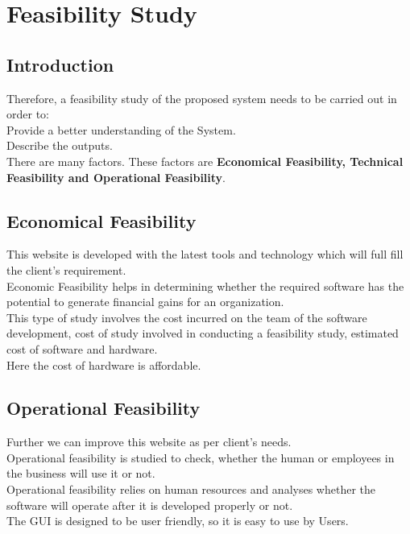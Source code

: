 \chapter{Feasibility Study}


\section{Introduction}
Therefore, a feasibility study of the proposed system needs to be carried out in order to:\\
\textbullet \hspace{0.2cm} 	Provide a better understanding of the System.\\
\textbullet \hspace{0.2cm}	Describe the outputs.\\

There are many factors. These factors are \textbf{Economical Feasibility, Technical Feasibility and Operational Feasibility}.\\



\section{Economical Feasibility}
\textbullet \hspace{0.2cm} This website is developed with the latest tools and technology which will full fill the client’s requirement.\\
\textbullet \hspace{0.2cm} Economic Feasibility helps in determining whether the required software has the potential to generate financial gains for an organization.\\
\textbullet \hspace{0.2cm} This type of study involves the cost incurred on the team of the software development, cost of study involved in conducting a feasibility study, estimated cost of software and hardware.\\
\textbullet \hspace{0.2cm} Here the cost of hardware is affordable.



\section{Operational Feasibility}
\textbullet \hspace{0.2cm} Further we can improve this website as per client’s needs.\\
\textbullet \hspace{0.2cm} Operational feasibility is studied to check, whether the human or employees in the business will use it or not. \\
\textbullet \hspace{0.2cm} Operational feasibility relies on human resources and analyses whether the software will operate after it is developed properly or not. \\
\textbullet \hspace{0.2cm} The GUI is designed to be user friendly, so it is easy to use by Users. 


